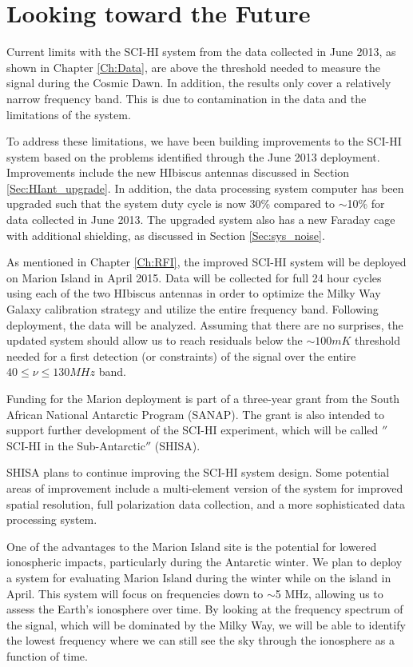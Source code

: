 \chapter{Looking toward the Future}\label{Ch:Conclude}

Current limits with the SCI-HI system from the data collected in June 2013, as shown in Chapter \ref{Ch:Data}, are above the threshold needed to measure the \cm signal during the Cosmic Dawn. In addition, the results only cover a relatively narrow frequency band. This is due to contamination in the data and the limitations of the system. 

To address these limitations, we have been building improvements to the SCI-HI system based on the problems identified through the June 2013 deployment. Improvements include the new HIbiscus antennas discussed in Section \ref{Sec:HIant_upgrade}. In addition, the data processing system computer has been upgraded such that the system duty cycle is now 30\% compared to $\sim$10\% for data collected in June 2013. The upgraded system also has a new Faraday cage with additional shielding, as discussed in Section \ref{Sec:sys_noise}. 

As mentioned in Chapter \ref{Ch:RFI}, the improved SCI-HI system will be deployed on Marion Island in April 2015. Data will be collected for full 24 hour cycles using each of the two HIbiscus antennas in order to optimize the Milky Way Galaxy calibration strategy and utilize the entire frequency band. Following deployment, the data will be analyzed. Assuming that there are no surprises, the updated system should allow us to reach residuals below the $\sim100 mK$ threshold needed for a first detection (or constraints) of the \cm signal over the entire $40 \leq \nu \leq 130 MHz$ band. 

Funding for the Marion deployment is part of a three-year grant from the South African National Antarctic Program (SANAP). The grant is also intended to support further development of the SCI-HI experiment, which will be called $''$SCI-HI in the Sub-Antarctic$''$ (SHISA). 

SHISA plans to continue improving the SCI-HI system design. Some potential areas of improvement include a multi-element version of the system for improved spatial resolution, full polarization data collection, and a more sophisticated data processing system. 

One of the advantages to the Marion Island site is the potential for lowered ionospheric impacts, particularly during the Antarctic winter. We plan to deploy a system for evaluating Marion Island during the winter while on the island in April. This system will focus on frequencies down to $\sim$5 MHz, allowing us to assess the Earth's ionosphere over time. By looking at the frequency spectrum of the signal, which will be dominated by the Milky Way, we will be able to identify the lowest frequency where we can still see the sky through the ionosphere as a function of time. 
